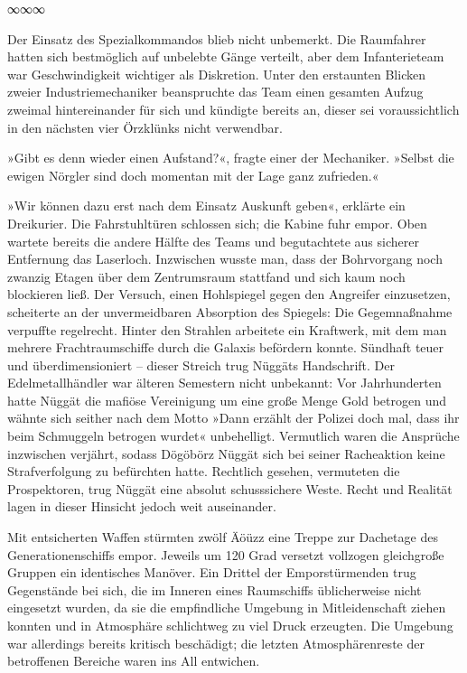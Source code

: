 \begin{center}
	∞∞∞
\end{center}

Der Einsatz des Spezialkommandos blieb nicht unbemerkt. Die Raumfahrer hatten sich bestmöglich auf unbelebte Gänge verteilt, aber dem Infanterieteam war Geschwindigkeit wichtiger als Diskretion. Unter den erstaunten Blicken zweier Industriemechaniker beanspruchte das Team einen gesamten Aufzug zweimal hintereinander für sich und kündigte bereits an, dieser sei voraussichtlich in den nächsten vier Örzklünks nicht verwendbar.

»Gibt es denn wieder einen Aufstand?«, fragte einer der Mechaniker. »Selbst die ewigen Nörgler sind doch momentan mit der Lage ganz zufrieden.«

»Wir können dazu erst nach dem Einsatz Auskunft geben«, erklärte ein Dreikurier. Die Fahrstuhltüren schlossen sich; die Kabine fuhr empor. Oben wartete bereits die andere Hälfte des Teams und begutachtete aus sicherer Entfernung das Laserloch. Inzwischen wusste man, dass der Bohrvorgang noch zwanzig Etagen über dem Zentrumsraum stattfand und sich kaum noch blockieren ließ. Der Versuch, einen Hohlspiegel gegen den Angreifer einzusetzen, scheiterte an der unvermeidbaren Absorption des Spiegels: Die Gegemnaßnahme verpuffte regelrecht. Hinter den Strahlen arbeitete ein Kraftwerk, mit dem man mehrere Frachtraumschiffe durch die Galaxis befördern konnte. Sündhaft teuer und überdimensioniert – dieser Streich trug Nüggäts Handschrift. Der Edelmetallhändler war älteren Semestern nicht unbekannt: Vor Jahrhunderten hatte Nüggät die mafiöse Vereinigung um eine große Menge Gold betrogen und wähnte sich seither nach dem Motto »Dann erzählt der Polizei doch mal, dass ihr beim Schmuggeln betrogen wurdet« unbehelligt. Vermutlich waren die Ansprüche inzwischen verjährt, sodass Dögöbörz Nüggät sich bei seiner Racheaktion keine Strafverfolgung zu befürchten hatte. Rechtlich gesehen, vermuteten die Prospektoren, trug Nüggät eine absolut schusssichere Weste. Recht und Realität lagen in dieser Hinsicht jedoch weit auseinander.

Mit entsicherten Waffen stürmten zwölf Äöüzz eine Treppe zur Dachetage des Generationenschiffs empor. Jeweils um 120 Grad versetzt vollzogen gleichgroße Gruppen ein identisches Manöver. Ein Drittel der Emporstürmenden trug Gegenstände bei sich, die im Inneren eines Raumschiffs üblicherweise nicht eingesetzt wurden, da sie die empfindliche Umgebung in Mitleidenschaft ziehen konnten und in Atmosphäre schlichtweg zu viel Druck erzeugten. Die Umgebung war allerdings bereits kritisch beschädigt; die letzten Atmosphärenreste der betroffenen Bereiche waren ins All entwichen.

